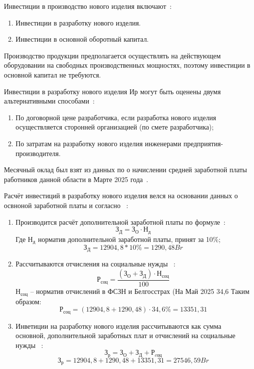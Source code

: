 Инвестиции в производство нового изделия включают~\cite{bsuir-project-economics}:
\begin{enumerate}
\item Инвестиции в разработку нового изделия.
\item Инвестиции в основной оборотный капитал.
\end{enumerate}

Производство продукции предполагается осуществлять на действующем
оборудовании на свободных производственных мощностях, поэтому
инвестиции в основной капитал не требуются.


Инвестиции в разработку нового изделия $Ир$ могут быть оценены двумя
альтернативными способами~\cite{bsuir-project-economics}:
\begin{enumerate}
\item По договорной цене разработчика, если разработка нового изделия
  осуществляется сторонней организацией (по смете разработчика);
\item По затратам на разработку нового изделия инженерами
  предприятия-производителя.
\end{enumerate}



Месячный оклад был взят из данных по о начислении средней заработной
платы работников данной области в Марте 2025
года~\cite{belstat-salary}.

% 

Расчёт инвестиций в разработку нового изделия велся на основании данных о освноной
заработной платы и согласно ~\cite{bsuir-project-economics}:
\begin{enumerate}
\item Производится расчёт дополнительной заработной платы по формуле~\cite{bsuir-project-economics}:
  \begin{equation} З_Д = З_О \cdot Н_д \end{equation}
  Где $Н_д$ норматив дополнительной заработной платы, принят за 10\%;
  $$З_Д = 12904,8 * 10\% = 1290,48Br $$
\item Рассчитываются отчисления на социальные нужды ~\cite{bsuir-project-economics}:
  \begin{equation}
    Р_{соц} = \frac{(З_О + З_Д) \cdot Н_{соц}}{100}
  \end{equation}
  $Н_{соц}$ – норматив отчислений в ФСЗН и Белгосстрах (На Май 2025 34,6%
  Таким образом:
  $$Р_{соц} = (12904,8 + 1290,48) \cdot 34,6\% = 13351,31$$
\item Инветиции на разработку нового изделия рассчитываются как сумма
основной, дополнительной заработных плат и отчислений на социальные
нужды ~\cite{bsuir-project-economics}:
\begin{equation}
  З_р = З_О + З_Д +Р_{cоц}
\end{equation}
 $$ З_р = 12904,8 + 1290,48 + 13351,31 = 27546,59Br$$
\end{enumerate}


